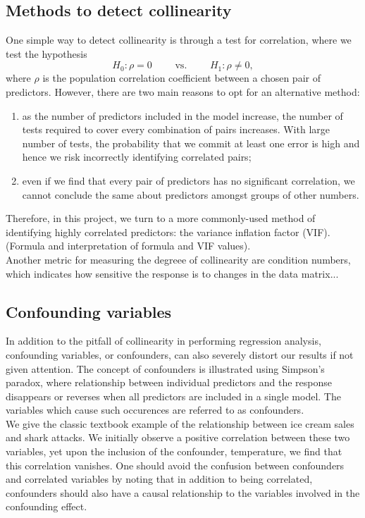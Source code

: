 \documentclass[12pt]{article}
\begin{document}
	\subsection{Methods to detect collinearity}
	
	One simple way to detect collinearity is through a test for correlation, where we test the hypothesis
	$$H_0: \rho=0 \quad\quad\text{ vs. }\quad\quad H_1: \rho\neq 0,$$
	where $\rho$ is the population correlation coefficient between a chosen pair of predictors. However, there are two main reasons to opt for an alternative method: 
	\begin{enumerate}
		\item as the number of predictors included in the model increase, the number of tests required to cover every combination of pairs increases. With large number of tests, the probability that we commit at least one error is high and hence we risk incorrectly identifying correlated pairs;
		\item even if we find that every pair of predictors has no significant correlation, we cannot conclude the same about predictors amongst groups of other numbers. 
	\end{enumerate}
	
	Therefore, in this project, we turn to a more commonly-used method of identifying highly correlated predictors: the variance inflation factor (VIF). (Formula and interpretation of formula and VIF values).\\
	
	Another metric for measuring the degreee of collinearity are condition numbers, which indicates how sensitive the response is to changes in the data matrix...
	
	\subsection{Confounding variables}
	
	In addition to the pitfall of collinearity in performing regression analysis, confounding variables, or confounders, can also severely distort our results if not given attention. The concept of confounders is illustrated using Simpson's paradox, where relationship between individual predictors and the response disappears or reverses when all predictors are included in a single model. The variables which cause such occurences are referred to as confounders.\\
	
	We give the classic textbook example of the relationship between ice cream sales and shark attacks. We initially observe a positive correlation between these two variables, yet upon the inclusion of the confounder, temperature, we find that this correlation vanishes. One should avoid the confusion between confounders and correlated variables by noting that in addition to being correlated, confounders should also have a causal relationship to the variables involved in the confounding effect.\\
	
\end{document}
